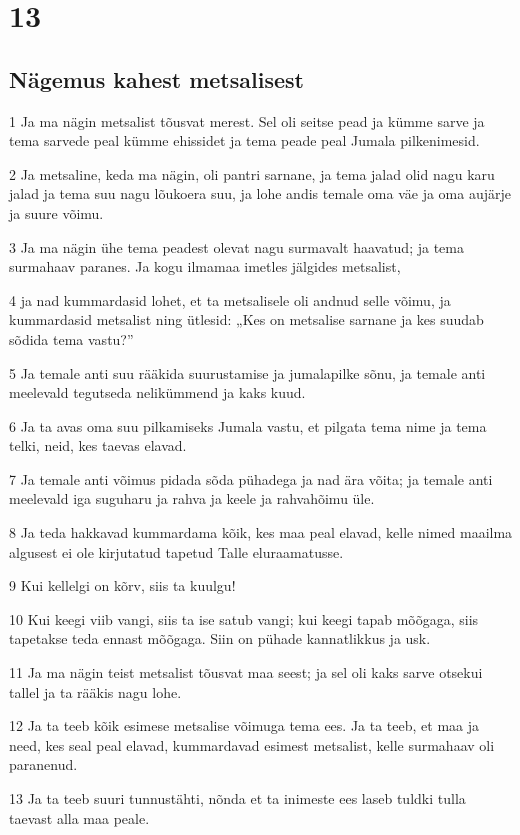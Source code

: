 \chapter{13}

\section*{Nägemus kahest metsalisest}

\par 1 Ja ma nägin metsalist tõusvat merest. Sel oli seitse pead ja kümme sarve ja tema sarvede peal kümme ehissidet ja tema peade peal Jumala pilkenimesid.
\par 2 Ja metsaline, keda ma nägin, oli pantri sarnane, ja tema jalad olid nagu karu jalad ja tema suu nagu lõukoera suu, ja lohe andis temale oma väe ja oma aujärje ja suure võimu.
\par 3 Ja ma nägin ühe tema peadest olevat nagu surmavalt haavatud; ja tema surmahaav paranes. Ja kogu ilmamaa imetles jälgides metsalist,
\par 4 ja nad kummardasid lohet, et ta metsalisele oli andnud selle võimu, ja kummardasid metsalist ning ütlesid: „Kes on metsalise sarnane ja kes suudab sõdida tema vastu?”
\par 5 Ja temale anti suu rääkida suurustamise ja jumalapilke sõnu, ja temale anti meelevald tegutseda nelikümmend ja kaks kuud.
\par 6 Ja ta avas oma suu pilkamiseks Jumala vastu, et pilgata tema nime ja tema telki, neid, kes taevas elavad.
\par 7 Ja temale anti võimus pidada sõda pühadega ja nad ära võita; ja temale anti meelevald iga suguharu ja rahva ja keele ja rahvahõimu üle.
\par 8 Ja teda hakkavad kummardama kõik, kes maa peal elavad, kelle nimed maailma algusest ei ole kirjutatud tapetud Talle eluraamatusse.
\par 9 Kui kellelgi on kõrv, siis ta kuulgu!
\par 10 Kui keegi viib vangi, siis ta ise satub vangi; kui keegi tapab mõõgaga, siis tapetakse teda ennast mõõgaga. Siin on pühade kannatlikkus ja usk.
\par 11 Ja ma nägin teist metsalist tõusvat maa seest; ja sel oli kaks sarve otsekui tallel ja ta rääkis nagu lohe.
\par 12 Ja ta teeb kõik esimese metsalise võimuga tema ees. Ja ta teeb, et maa ja need, kes seal peal elavad, kummardavad esimest metsalist, kelle surmahaav oli paranenud.
\par 13 Ja ta teeb suuri tunnustähti, nõnda et ta inimeste ees laseb tuldki tulla taevast alla maa peale.
